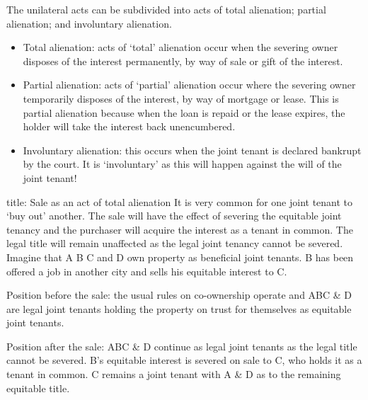 \documentclass[
]{article}
\newenvironment{Shaded}{}{}
\newcommand{\NormalTok}[1]{#1}
\providecommand{\tightlist}{%
  \setlength{\itemsep}{0pt}\setlength{\parskip}{0pt}}
\begin{document}
The unilateral acts can be subdivided into acts of total alienation;
partial alienation; and involuntary alienation.

\begin{itemize}
\tightlist
\item
  Total alienation: acts of `total' alienation occur when the severing
  owner disposes of the interest permanently, by way of sale or gift of
  the interest.
\item
  Partial alienation: acts of `partial' alienation occur where the
  severing owner temporarily disposes of the interest, by way of
  mortgage or lease. This is partial alienation because when the loan is
  repaid or the lease expires, the holder will take the interest back
  unencumbered.
\item
  Involuntary alienation: this occurs when the joint tenant is declared
  bankrupt by the court. It is `involuntary' as this will happen against
  the will of the joint tenant!
\end{itemize}

\begin{Shaded}
\begin{Highlighting}[]
\NormalTok{title: Sale as an act of total alienation}
\NormalTok{It is very common for one joint tenant to ‘buy out’ another. The sale will have the effect of severing the equitable joint tenancy and the purchaser will acquire the interest as a tenant in common. The legal title will remain unaffected as the legal joint tenancy cannot be severed. Imagine that A B C and D own property as beneficial joint tenants. B has been offered a job in another city and sells his equitable interest to C.}

\NormalTok{Position before the sale: the usual rules on co{-}ownership operate and ABC \& D are legal joint tenants holding the property on trust for themselves as equitable joint tenants.}

\NormalTok{Position after the sale: ABC \& D continue as legal joint tenants as the legal title cannot be severed. B’s equitable interest is severed on sale to C, who holds it as a tenant in common. C remains a joint tenant with A \& D as to the remaining equitable title.}
\end{Highlighting}
\end{Shaded}
\end{document}
